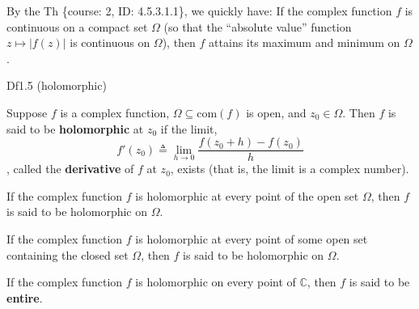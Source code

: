 \documentclass{article}
\begin{document}
\begin{Rmk}{}
    By the Th \{course: 2, ID: 4.5.3.1.1\}, we quickly have:
    \textcolor{Th}{If the complex function $f$ is continuous on a compact set $\Omega$ (so that the ``absolute value'' function $z\mapsto |f(z)|$ is continuous on $\Omega$), then $f$ attains its maximum and minimum on $\Omega$.}
\end{Rmk}

\begin{Df}{Df1.5 (holomorphic)}
    \begin{compactenum}
        \item Suppose $f$ is a complex function, $\Omega\subseteq\text{com}(f)$ is open, and $z_0\in\Omega$. Then $f$ is said to be \textbf{holomorphic} at $z_0$ if the limit, 
        $$f'(z_0) \triangleq \lim_{h\to 0} \frac{f(z_0+h)-f(z_0)}{h}$$
        , called the \textbf{derivative} of $f$ at $z_0$, exists (that is, the limit is a complex number).
        \item If the complex function $f$ is holomorphic at every point of the open set $\Omega$, then $f$ is said to be holomorphic on $\Omega$.
        \item If the complex function $f$ is holomorphic at every point of some open set containing the closed set $\Omega$, then $f$ is said to be holomorphic on $\Omega$.
        \item If the complex function $f$ is holomorphic on every point of $\mathbb{C}$, then $f$ is said to be \textbf{entire}.
    \end{compactenum}
\end{Df}
\end{document}
